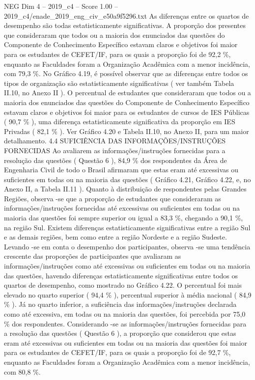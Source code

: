 \begin{textsample}{NEG Dim 4 – 2019\_c4 – Score 1.00 – 2019\_c4/enade\_2019\_eng\_civ\_e50a9f5296.txt}
As diferenças entre os quartos de desempenho são todas estatisticamente significativas.
A proporção dos presentes que consideraram que todos ou a maioria dos enunciados das questões do Componente de Conhecimento Específico estavam claros e objetivos foi maior para os estudantes de CEFET/IF, para os quais a proporção foi de 92,2 \%, enquanto as Faculdades foram a Organização Acadêmica com a menor incidência, com 79,3 \%.
No Gráfico 4.19, é possível observar que as diferenças entre todos os tipos de organização são estatisticamente significativas ( ver também Tabela II.10, no Anexo II ).
O percentual de estudantes que consideraram que todos ou a maioria dos enunciados das questões do Componente de Conhecimento Específico estavam claros e objetivos foi maior para os estudantes de cursos de IES Públicas ( 90,7 \% ), uma diferença estatisticamente significativa da proporção em IES Privadas ( 82,1 \% ).
Ver Gráfico 4.20 e Tabela II.10, no Anexo II, para um maior detalhamento. 4.4 SUFICIÊNCIA DAS INFORMAÇÕES/INSTRUÇÕES FORNECIDAS Ao avaliarem as informações/instruções fornecidas para a resolução das questões ( Questão 6 ), 84,9 \% dos respondentes da Área de Engenharia Civil de todo o Brasil afirmaram que estas eram até excessivas ou suficientes em todas ou na maioria das questões ( Gráfico 4.21, Gráfico 4.22, e, no Anexo II, a Tabela II.11 ).
Quanto à distribuição de respondentes pelas Grandes Regiões, observa -se que a proporção de estudantes que consideraram as informações/instruções fornecidas até excessivas ou suficientes em todas ou na maioria das questões foi sempre superior ou igual a 83,3 \%, chegando a 90,1 \%, na região Sul.
Existem diferenças estatisticamente significativas entre a região Sul e as demais regiões, bem como entre a região Nordeste e a região Sudeste.
Levando -se em conta o desempenho dos participantes, observa -se uma tendência crescente das proporções de participantes que avaliaram as informações/instruções como até excessivas ou suficientes em todas ou na maioria das questões, havendo diferenças estatisticamente significativas entre todos os quartos de desempenho, como mostrado no Gráfico 4.22.
O percentual foi mais elevado no quarto superior ( 94,4 \% ), percentual superior à média nacional ( 84,9 \% ).
Já no quarto inferior, a suficiência das informações/instruções declarada como até excessiva, em todas ou na maioria das questões, foi percebida por 75,0 \% dos respondentes.
Considerando -se as informações/instruções fornecidas para a resolução das questões ( Questão 6 ), a proporção que considerou que estas eram até excessivas ou suficientes em todas ou na maioria das questões foi maior para os estudantes de CEFET/IF, para os quais a proporção foi de 92,7 \%, enquanto as Faculdades foram a Organização Acadêmica com a menor incidência, com 80,8 \%.

\end{textsample}
